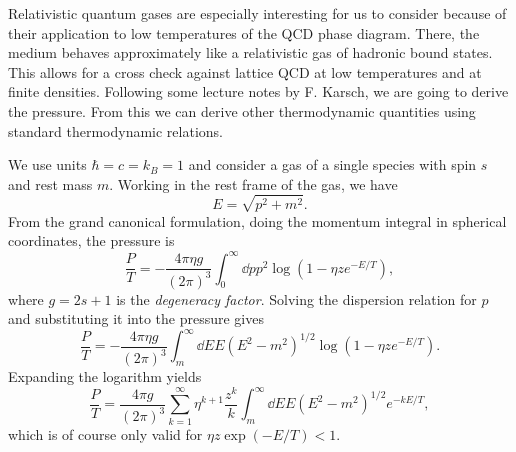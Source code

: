 Relativistic quantum gases are especially interesting for us
to consider because of their
application to low temperatures of the QCD phase diagram. There, the medium
behaves approximately like a relativistic gas of hadronic bound states.
This allows for a cross check against lattice QCD at low temperatures
and at finite densities. Following some lecture notes by F. Karsch,
we are going to derive the
pressure. From this we can derive other thermodynamic quantities
using standard thermodynamic relations.

We use units $\hbar=c=k_B=1$ and consider a gas of a single species
with spin $s$ and rest mass $m$. Working in the rest frame of the gas,
we have
\begin{equation}\label{eq:dispersion}
  E=\sqrt{p^2+m^2}.  
\end{equation}
From the grand canonical formulation,
doing the momentum integral in spherical coordinates, the pressure is
\begin{equation}
  \frac{P}{T}=-\frac{4\pi\eta g}{(2\pi)^3}\int_0^\infty 
      \dd{p}p^2\log\left(1-\eta z e^{-E/T}\right),
\end{equation}
where $g=2s+1$ is the {\it degeneracy factor}. 
Solving the dispersion relation
for $p$ and substituting it into the pressure gives
\begin{equation}
  \frac{P}{T}=-\frac{4\pi\eta g}{(2\pi)^3}\int_m^\infty 
      \dd{E}E\left(E^2-m^2\right)^{1/2}\log\left(1-\eta z e^{-E/T}\right).
\end{equation}
Expanding the logarithm yields
\begin{equation}\label{eq:pressE}
  \frac{P}{T}=\frac{4\pi g}{(2\pi)^3}\sum_{k=1}^\infty\eta^{k+1}\frac{z^k}{k}\int_m^\infty 
      \dd{E}E\left(E^2-m^2\right)^{1/2}e^{-kE/T},
\end{equation}
which is of course only valid for $\eta z\exp(-E/T)<1$.

